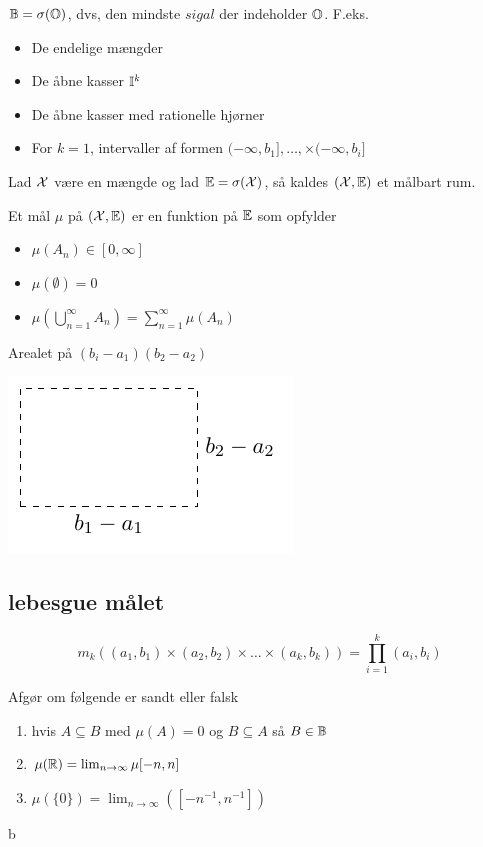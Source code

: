 \({\mathbb{B}}=\sigma({\mathbb{O}})\), dvs, den mindste \(sigal\) der indeholder \({\mathbb{O}}\). F.eks.
\begin{itemize}
  \item De endelige mængder
  \item De åbne kasser \({\mathbb{I}}^k\)
  \item De åbne kasser med rationelle hjørner
  \item For \(k=1\), intervaller af formen \((-\infty,b_1],\ldots,\times(-\infty,b_i] \)
\end{itemize}
Lad \({\mathcal{X}}\) være en mængde og lad \({\mathbb{E}}=\sigma({\mathcal{X}})\), så kaldes \(({\mathcal{X}},{\mathbb{E}})\) et målbart rum.
\begin{defn}
Et mål \(\mu\) på \(({\mathcal{X}},{\mathbb{E}})\) er en funktion på \({\mathbb{E}}\) som opfylder
\begin{itemize}
  \item \(\mu(A_n)\in[0,\infty]\)
  \item \(\mu(\emptyset)=0\)
  \item \(\mu\left(\bigcup_{n=1}^\infty A_n\right)=\sum_{n=1}^\infty \mu(A_n)\)
\end{itemize}
\end{defn}
\begin{exmp}
Arealet på \((b_i-a_1)(b_2-a_2)\)\tabularnewline

\includegraphics{fig/box.pdf}
\end{exmp}
\subsection{lebesgue målet} %
\label{sub:lebesgue_m_let}
\begin{defn}
\[
  m_k((a_1,b_1)\times(a_2,b_2)\times\ldots\times(a_k,b_k))=\prod_{i=1}^k(a_i,b_i)
\]
\end{defn}
\begin{exercise}
Afgør om følgende er sandt eller falsk
\begin{enumerate}
  \item hvis \(A\subseteq B\) med \(\mu(A)=0\) og \(B\subseteq A\) så \(B\in {\mathbb{B}}\)
  \item \(\mu({\mathbb{R}})=\lim_{n \rightarrow \infty}\mu[-n,n]\)
  \item \(\mu(\{0\})=\lim_{n \rightarrow \infty}(\left[-n^{-1},n^{-1}\right])\)
  \end{enumerate}
\end{exercise}b

